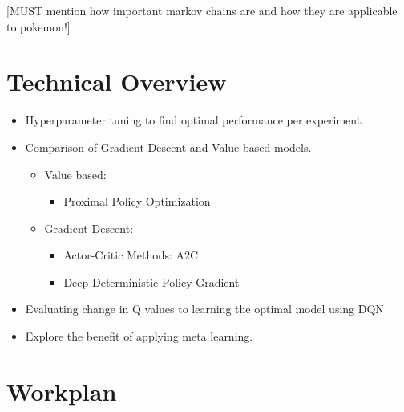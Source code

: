 \documentclass{surrey_disso_style}
\begin{document}
[MUST mention how important markov chains are and how they are applicable to pokemon!]

\section{Technical Overview}

\begin{itemize}
   \item Hyperparameter tuning to find optimal performance per experiment.
   \item Comparison of Gradient Descent and Value based models.
   \begin{itemize}
      \item Value based:
         \begin{itemize}
            \item Proximal Policy Optimization
         \end{itemize}
      \item Gradient Descent:
         \begin{itemize}
            \item Actor-Critic Methods: A2C 
            \item Deep Deterministic Policy Gradient
         \end{itemize}
   \end{itemize}
   \item Evaluating change in Q values to learning the optimal model using DQN
   \item Explore the benefit of applying meta learning.
\end{itemize}

\newpage
\section{Workplan}

\renewcommand{\arraystretch}{1.5}
\setlength{\tabcolsep}{8pt}
\end{document}
